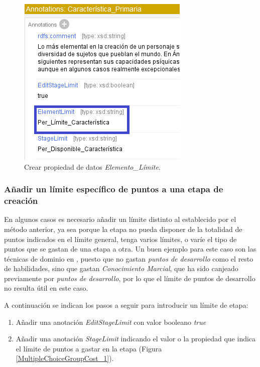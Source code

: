 \begin{enumerate}
    \begin{figure}[H]
        \centering
        \includegraphics[scale=0.8]{Figures/Protege/ElementLimit_3.png}
        \caption{Crear propiedad de datos \textit{Elemento\_Límite}.}
        \label{ElementLimit_3}
    \end{figure}
\end{enumerate}

\subsubsection{Añadir un límite específico de puntos a una etapa de creación}\label{SpecificLimit}
En algunos casos es necesario añadir un límite distinto al establecido por el método anterior, ya sea porque la etapa no pueda 
disponer de la totalidad de puntos indicados en el límite general, tenga varios límites, o varíe el tipo de puntos que se gastan 
de una etapa a otra. Un buen ejemplo para este caso son las técnicas de dominio en \anima, 
puesto que no gastan \textit{puntos de desarrollo} como el resto de habilidades, sino que gastan 
\textit{Conocimiento Marcial}, que ha sido canjeado previamente por \textit{puntos de desarrollo}, 
por lo que el límite de puntos de desarrollo no resulta útil en este caso.\medskip

A continuación se indican los pasos a seguir para introducir un límite de etapa:
\begin{enumerate}\newpage
    \item Añadir una anotación \textit{EditStageLimit} con valor booleano \textit{true}
    \item Añadir una anotación \textit{StageLimit} indicando el valor 
    o la propiedad que indica el límite de puntos a gastar en la etapa (Figura \ref*{MultipleChoiceGroupCost_1}).
\end{enumerate}

